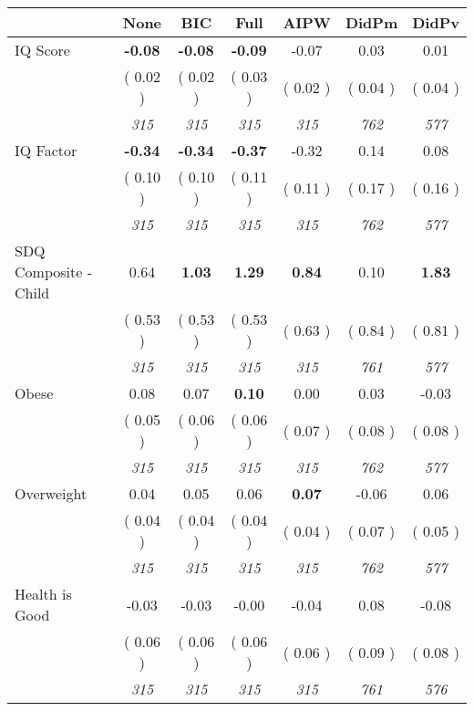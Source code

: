 \begin{tabular}{l c c c c c c}
\toprule
 & None & BIC & Full & AIPW & DidPm & DidPv \\
\midrule
IQ Score & \textbf{     -0.08 } & \textbf{     -0.08 } & \textbf{     -0.09 } &     -0.07 &      0.03 &      0.01 \\
& (     0.02 ) & (     0.02 ) & (     0.03 ) & (     0.02 ) & (     0.04 ) & (     0.04 ) \\
& \textit{ 315 } & \textit{ 315 } & \textit{ 315 } & \textit{ 315 } & \textit{ 762 } & \textit{ 577 } \\
IQ Factor & \textbf{     -0.34 } & \textbf{     -0.34 } & \textbf{     -0.37 } &     -0.32 &      0.14 &      0.08 \\
& (     0.10 ) & (     0.10 ) & (     0.11 ) & (     0.11 ) & (     0.17 ) & (     0.16 ) \\
& \textit{ 315 } & \textit{ 315 } & \textit{ 315 } & \textit{ 315 } & \textit{ 762 } & \textit{ 577 } \\
SDQ Composite - Child &      0.64 & \textbf{      1.03 } & \textbf{      1.29 } & \textbf{     0.84} &      0.10 & \textbf{      1.83 } \\
& (     0.53 ) & (     0.53 ) & (     0.53 ) & (     0.63 ) & (     0.84 ) & (     0.81 ) \\
& \textit{ 315 } & \textit{ 315 } & \textit{ 315 } & \textit{ 315 } & \textit{ 761 } & \textit{ 577 } \\
Obese &      0.08 &      0.07 & \textbf{      0.10 } &      0.00 &      0.03 &     -0.03 \\
& (     0.05 ) & (     0.06 ) & (     0.06 ) & (     0.07 ) & (     0.08 ) & (     0.08 ) \\
& \textit{ 315 } & \textit{ 315 } & \textit{ 315 } & \textit{ 315 } & \textit{ 762 } & \textit{ 577 } \\
Overweight &      0.04 &      0.05 &      0.06 & \textbf{     0.07} &     -0.06 &      0.06 \\
& (     0.04 ) & (     0.04 ) & (     0.04 ) & (     0.04 ) & (     0.07 ) & (     0.05 ) \\
& \textit{ 315 } & \textit{ 315 } & \textit{ 315 } & \textit{ 315 } & \textit{ 762 } & \textit{ 577 } \\
Health is Good &     -0.03 &     -0.03 &     -0.00 &     -0.04 &      0.08 &     -0.08 \\
& (     0.06 ) & (     0.06 ) & (     0.06 ) & (     0.06 ) & (     0.09 ) & (     0.08 ) \\
& \textit{ 315 } & \textit{ 315 } & \textit{ 315 } & \textit{ 315 } & \textit{ 761 } & \textit{ 576 } \\

\end{tabular}
